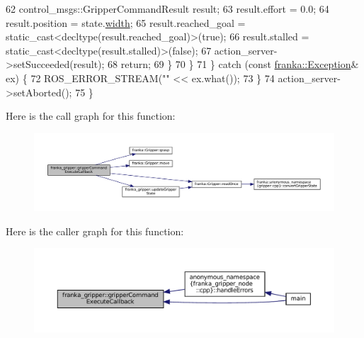 \begin{DoxyCode}
62         control\_msgs::GripperCommandResult result;
63         result.effort = 0.0;
64         result.position = state.\hyperlink{structfranka_1_1GripperState_adf095f446ec39a9a48e120b209dcd6e9}{width};
65         result.reached\_goal = \textcolor{keyword}{static\_cast<}decltype(result.reached\_goal)\textcolor{keyword}{>}(\textcolor{keyword}{true});
66         result.stalled = \textcolor{keyword}{static\_cast<}decltype(result.stalled)\textcolor{keyword}{>}(\textcolor{keyword}{false});
67         action\_server->setSucceeded(result);
68         \textcolor{keywordflow}{return};
69       \}
70     \}
71   \} \textcolor{keywordflow}{catch} (\textcolor{keyword}{const} \hyperlink{structfranka_1_1Exception}{franka::Exception}& ex) \{
72     ROS\_ERROR\_STREAM(\textcolor{stringliteral}{""} << ex.what());
73   \}
74   action\_server->setAborted();
75 \}
\end{DoxyCode}
Here is the call graph for this function\+:
\nopagebreak
\begin{figure}[H]
\begin{center}
\leavevmode
\includegraphics[width=350pt]{namespacefranka__gripper_ae9fb03aae11c03a4ad2c5d5c88b80166_cgraph}
\end{center}
\end{figure}
Here is the caller graph for this function\+:
\nopagebreak
\begin{figure}[H]
\begin{center}
\leavevmode
\includegraphics[width=350pt]{namespacefranka__gripper_ae9fb03aae11c03a4ad2c5d5c88b80166_icgraph}
\end{center}
\end{figure}
\mbox{\label{namespacefranka__gripper_a098e502a3ba4aed6147ec76f1421e803}} 
